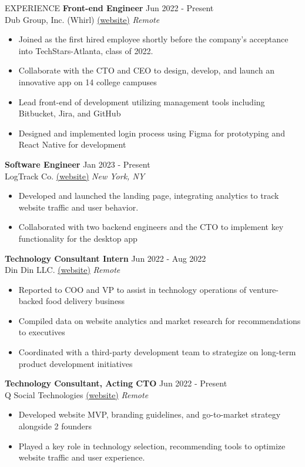 \documentclass{resume} %
\begin{document}
\begin{rSection}{EXPERIENCE}
\textbf{Front-end Engineer} \hfill Jun 2022 - Present\\
Dub Group, Inc. (Whirl) \href{https://letswhirl.com/}{(website)} \hfill \textit{Remote}
 \begin{itemize}
    \itemsep -2pt {} 
     \item Joined as the first hired employee shortly before the company's acceptance into TechStars-Atlanta, class of 2022.
     \item Collaborate with the CTO and CEO to design, develop, and launch an innovative app on 14 college campuses
     \item Lead front-end of development utilizing management tools including Bitbucket, Jira, and GitHub
     \item Designed and implemented login process using Figma for prototyping and React Native for development
 \end{itemize}

\textbf{Software Engineer} \hfill Jan 2023 - Present\\
LogTrack Co. \href{https://www.thelogtrack.com/}{(website)} \hfill \textit{New York, NY}
 \begin{itemize}
    \itemsep -3pt {} 
     \item Developed and launched the landing page, integrating analytics to track website traffic and user behavior.
     \item Collaborated with two backend engineers and the CTO to implement key functionality for the desktop app
 \end{itemize}

\textbf{Technology Consultant Intern} \hfill Jun 2022 - Aug 2022\\
Din Din LLC. \href{https://www.eatdindin.com/landing-page}{(website)} \hfill \textit{Remote}
 \begin{itemize}
    \itemsep -3pt {} 
     \item Reported to COO and VP to assist in technology operations of venture-backed food delivery business
     \item Compiled data on website analytics and market research for recommendations to executives
     \item Coordinated with a third-party development team to strategize on long-term product development initiatives
 \end{itemize}

\textbf{Technology Consultant, Acting CTO} \hfill Jun 2022 - Present\\
Q Social Technologies \href{https://www.q-social.com/}{(website)} \hfill \textit{Remote} 
 \begin{itemize}
    \itemsep -3pt {} 
     \item Developed website MVP, branding guidelines, and go-to-market strategy alongside 2 founders
     \item Played a key role in technology selection, recommending tools to optimize website traffic and user experience.
 \end{itemize}


\end{rSection}
\end{document}
